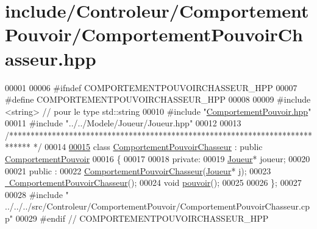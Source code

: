 \hypertarget{_comportement_pouvoir_chasseur_8hpp_source}{\section{include/\-Controleur/\-Comportement\-Pouvoir/\-Comportement\-Pouvoir\-Chasseur.hpp}
}

\begin{DoxyCode}
00001 
00006 \textcolor{preprocessor}{#ifndef COMPORTEMENTPOUVOIRCHASSEUR\_HPP}
00007 \textcolor{preprocessor}{}\textcolor{preprocessor}{#define COMPORTEMENTPOUVOIRCHASSEUR\_HPP}
00008 \textcolor{preprocessor}{}
00009 \textcolor{preprocessor}{#include <string>} \textcolor{comment}{// pour le type std::string}
00010 \textcolor{preprocessor}{#include "\hyperlink{_comportement_pouvoir_8hpp}{ComportementPouvoir.hpp}"}
00011 \textcolor{preprocessor}{#include "../../Modele/Joueur/Joueur.hpp"}
00012 
00013 \textcolor{comment}{/*****************************************************************************
      */}
00014 
\hypertarget{_comportement_pouvoir_chasseur_8hpp_source_l00015}{}\hyperlink{class_comportement_pouvoir_chasseur}{00015} \textcolor{keyword}{class }\hyperlink{class_comportement_pouvoir_chasseur}{ComportementPouvoirChasseur} : \textcolor{keyword}{public} \hyperlink{class_comportement_pouvoir}{ComportementPouvoir}
00016 \{
00017 
00018    \textcolor{keyword}{private}:
00019     \hyperlink{class_joueur}{Joueur}* joueur;
00020 
00021    \textcolor{keyword}{public} :
00022       \hyperlink{class_comportement_pouvoir_chasseur_a051c87d077549a7edb5eb1e8c9944aff}{ComportementPouvoirChasseur}(\hyperlink{class_joueur}{Joueur}* j);
00023       \hyperlink{class_comportement_pouvoir_chasseur_aaad834dea06fd69007e220d611927091}{~ComportementPouvoirChasseur}();
00024       \textcolor{keywordtype}{void} \hyperlink{class_comportement_pouvoir_chasseur_a334058c088f33d706f636cadd97150da}{pouvoir}();
00025     
00026 \};
00027 
00028 \textcolor{preprocessor}{#include "
      ../../../src/Controleur/ComportementPouvoir/ComportementPouvoirChasseur.cpp"}
00029 \textcolor{preprocessor}{#endif // COMPORTEMENTPOUVOIRCHASSEUR\_HPP}
\end{DoxyCode}
